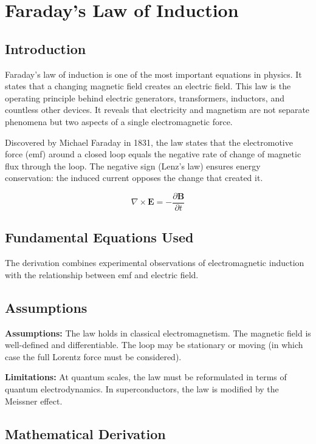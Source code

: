 \chapter{Faraday's Law of Induction}

\section*{Introduction}

Faraday's law of induction is one of the most important equations in physics. It states that a changing magnetic field creates an electric field. This law is the operating principle behind electric generators, transformers, inductors, and countless other devices. It reveals that electricity and magnetism are not separate phenomena but two aspects of a single electromagnetic force.

Discovered by Michael Faraday in 1831, the law states that the electromotive force (emf) around a closed loop equals the negative rate of change of magnetic flux through the loop. The negative sign (Lenz's law) ensures energy conservation: the induced current opposes the change that created it.

\begin{equation}
\nabla \times \mathbf{E} = -\frac{\partial \mathbf{B}}{\partial t}
\end{equation}

\section*{Fundamental Equations Used}

The derivation combines experimental observations of electromagnetic induction with the relationship between emf and electric field.

\section*{Assumptions}

\textbf{Assumptions:} The law holds in classical electromagnetism. The magnetic field is well-defined and differentiable. The loop may be stationary or moving (in which case the full Lorentz force must be considered).

\textbf{Limitations:} At quantum scales, the law must be reformulated in terms of quantum electrodynamics. In superconductors, the law is modified by the Meissner effect.

\section*{Mathematical Derivation}


